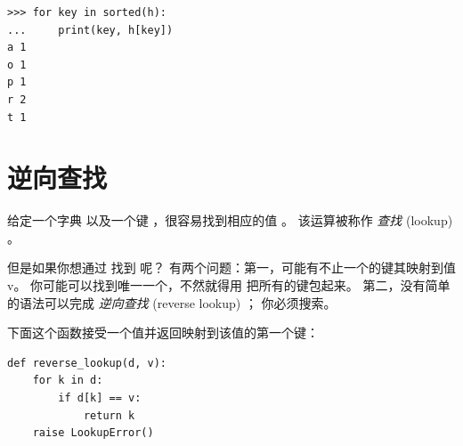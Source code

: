 \begin{lstlisting}
>>> for key in sorted(h):
...     print(key, h[key])
a 1
o 1
p 1
r 2
t 1
\end{lstlisting}



\section{逆向查找}
\label{raise}

  
  


给定一个字典  以及一个键  ，很容易找到相应的值  。
该运算被称作 {\em 查找} (lookup) 。


但是如果你想通过  找到  呢？
有两个问题：第一，可能有不止一个的键其映射到值v。
你可能可以找到唯一一个，不然就得用  把所有的键包起来。
第二，没有简单的语法可以完成 {\em 逆向查找} (reverse lookup) ； 你必须搜索。


下面这个函数接受一个值并返回映射到该值的第一个键：

\begin{lstlisting}
def reverse_lookup(d, v):
    for k in d:
        if d[k] == v:
            return k
    raise LookupError()
\end{lstlisting}

%

